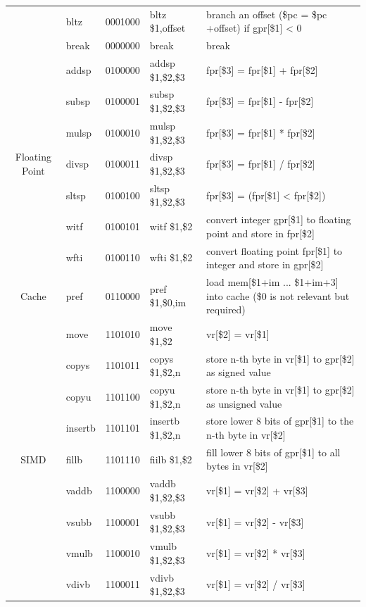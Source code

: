 \documentclass{sig-alternate}
\begin{document}
\begin{table}
\begin{tabular}{|c|l|c|l|p{8cm}|}
 & bltz & 0001000 & bltz \$1,offset & branch an offset (\$pc = \$pc +offset) if gpr[\$1] < 0 \\ \cline{2-5}
 & break & 0000000 & break & break \\ \hline
 \multirow{7}{*}{Floating Point} & addsp & 0100000 & addsp \$1,\$2,\$3 & fpr[\$3] = fpr[\$1] + fpr[\$2] \\ \cline{2-5}
 & subsp & 0100001 & subsp \$1,\$2,\$3 & fpr[\$3] = fpr[\$1] - fpr[\$2] \\ \cline{2-5}  
 & mulsp & 0100010 & mulsp \$1,\$2,\$3 & fpr[\$3] = fpr[\$1] * fpr[\$2] \\ \cline{2-5}
 & divsp & 0100011 & divsp \$1,\$2,\$3 & fpr[\$3] = fpr[\$1] / fpr[\$2] \\ \cline{2-5}
 & sltsp & 0100100 & sltsp \$1,\$2,\$3 & fpr[\$3] = (fpr[\$1] < fpr[\$2])\\ \cline{2-5}
 & witf & 0100101 & witf \$1,\$2 & convert integer gpr[\$1] to floating point and store in fpr[\$2] \\ \cline{2-5}
 & wfti & 0100110 & wfti \$1,\$2 & convert floating point fpr[\$1] to integer and store in gpr[\$2]\\ \hline
 Cache & pref & 0110000 & pref \$1,\$0,im & load mem[\$1+im ... \$1+im+3] into cache (\$0 is not relevant but required) \\ \hline
 \multirow{15}{*}{SIMD} & move & 1101010 & move \$1,\$2 & vr[\$2] = vr[\$1] \\ \cline{2-5}
 & copys & 1101011 & copys \$1,\$2,n & store n-th byte in vr[\$1] to gpr[\$2] as signed value \\ \cline{2-5}  
 & copyu & 1101100 & copyu \$1,\$2,n & store n-th byte in vr[\$1] to gpr[\$2] as unsigned value\\ \cline{2-5}
 & insertb & 1101101 & insertb \$1,\$2,n & store lower 8 bits of gpr[\$1] to the n-th byte in vr[\$2] \\ \cline{2-5}
 & fillb & 1101110 & fiilb \$1,\$2 & fill lower 8 bits of gpr[\$1] to all bytes in vr[\$2] \\ \cline{2-5}
 & vaddb & 1100000 & vaddb \$1,\$2,\$3 & vr[\$1] = vr[\$2] + vr[\$3] \\ \cline{2-5}
 & vsubb & 1100001 & vsubb \$1,\$2,\$3 & vr[\$1] = vr[\$2] - vr[\$3]  \\ \cline{2-5}  
 & vmulb & 1100010 & vmulb \$1,\$2,\$3 & vr[\$1] = vr[\$2] * vr[\$3]  \\ \cline{2-5}
 & vdivb & 1100011 & vdivb \$1,\$2,\$3 & vr[\$1] = vr[\$2] / vr[\$3]  \\ \cline{2-5}

\end{tabular}
\end{table}
\end{document}
